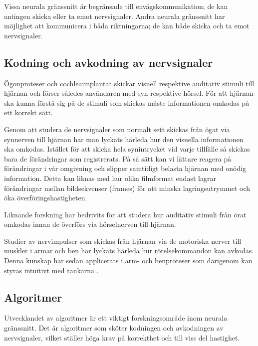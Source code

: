 \documentclass[12pt, a4paper]{article}
\begin{document}
Vissa neurala gränssnitt är begränsade till envägskommunikation; de kan antingen
skicka eller ta emot nervsignaler. Andra neurala gränssnitt har möjlighet att
kommunicera i båda riktningarna; de kan både skicka och ta emot nervsignaler.

\subsection{Kodning och avkodning av nervsignaler}
\label{enc_dec}

Ögonproteser \cite{sight2} och cochleaimplantat \cite{sound} skickar visuell
respektive auditativ stimuli till hjärnan och förser således användaren med syn
respektive hörsel. För att hjärnan ska kunna förstå sig på de stimuli som
skickas måste informationen omkodas på ett korrekt sätt.


Genom att studera de nervsignaler som normalt sett skickas från ögat via
synnerven till hjärnan har man lyckats härleda hur den visuella informationen ska
omkodas. Istället för att skicka hela synintrycket vid varje tillfälle så
skickas bara de förändringar som registrerats. På så sätt kan vi lättare reagera
på förändringar i vår omgivning och slipper samtidigt belasta hjärnan med onödig
information. \cite{sight1} Detta kan liknas med hur olika filmformat endast
lagrar förändringar mellan bildsekvenser (frames) för att minska
lagringsutrymmet och öka överföringshastigheten.

Liknande forskning har bedrivits för att studera hur auditativ stimuli från örat
omkodas innan de överförs via hörselnerven till hjärnan.

Studier av nervimpulser som skickas från hjärnan via de motoriska nerver till
muskler i armar och ben har lyckats härleda hur rörelsekommandon kan avkodas.
Denna kunskap har sedan applicerats i arm- och benproteser som därigenom kan
styras intuitivt med tankarna \cite{prosthetic_operation}.

\subsection{Algoritmer}

Utvecklandet av algoritmer är ett viktigt forskningsområde inom neurala
gränssnitt. Det är algoritmer som sköter kodningen och avkodningen av
nervsignaler, vilket ställer höga krav på korrekthet och till viss del
hastighet.
\end{document}
